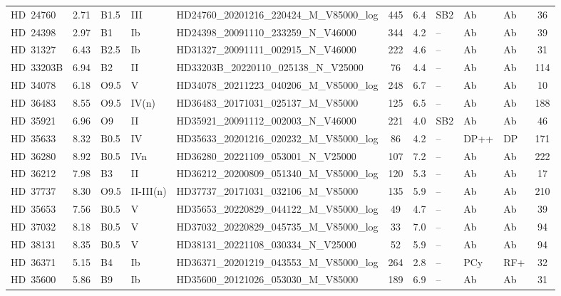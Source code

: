 {\begin{landscape}
\begin{longtable}{lclllcclllc}
\noalign{\smallskip}
HD~24760 & 2.71 & B1.5 & III & HD24760\_20201216\_220424\_M\_V85000\_log & 445 & 6.4 & SB2 & Ab & Ab & 36 \\
\noalign{\smallskip}
HD~24398 & 2.97 & B1 & Ib & HD24398\_20091110\_233259\_N\_V46000 & 344 & 4.2 & -- & Ab & Ab & 39 \\
\noalign{\smallskip}
HD~31327 & 6.43 & B2.5 & Ib & HD31327\_20091111\_002915\_N\_V46000 & 222 & 4.6 & -- & Ab & Ab & 31 \\
\noalign{\smallskip}
HD~33203B & 6.94 & B2 & II & HD33203B\_20220110\_025138\_N\_V25000 & 76 & 4.4 & -- & Ab & Ab & 114 \\
\noalign{\smallskip}
HD~34078 & 6.18 & O9.5 & V & HD34078\_20211223\_040206\_M\_V85000\_log & 248 & 6.7 & -- & Ab & Ab & 10 \\
\noalign{\smallskip}
HD~36483 & 8.55 & O9.5 & IV(n) & HD36483\_20171031\_025137\_M\_V85000 & 125 & 6.5 & -- & Ab & Ab & 188 \\
\noalign{\smallskip}
HD~35921 & 6.96 & O9 & II & HD35921\_20091112\_002003\_N\_V46000 & 221 & 4.0 & SB2 & Ab & Ab & 46 \\
\noalign{\smallskip}
HD~35633 & 8.32 & B0.5 & IV & HD35633\_20201216\_020232\_M\_V85000\_log & 86 & 4.2 & -- & DP++ & DP & 171 \\
\noalign{\smallskip}
HD~36280 & 8.92 & B0.5 & IVn & HD36280\_20221109\_053001\_N\_V25000 & 107 & 7.2 & -- & Ab & Ab & 222 \\
\noalign{\smallskip}
HD~36212 & 7.98 & B3 & II & HD36212\_20200809\_051340\_M\_V85000\_log & 120 & 5.3 & -- & Ab & Ab & 17 \\
\noalign{\smallskip}
HD~37737 & 8.30 & O9.5 & II-III(n) & HD37737\_20171031\_032106\_M\_V85000 & 135 & 5.9 & -- & Ab & Ab & 210 \\
\noalign{\smallskip}
HD~35653 & 7.56 & B0.5 & V & HD35653\_20220829\_044122\_M\_V85000\_log & 49 & 4.7 & -- & Ab & Ab & 39 \\
\noalign{\smallskip}
HD~37032 & 8.18 & B0.5 & V & HD37032\_20220829\_045735\_M\_V85000\_log & 33 & 7.0 & -- & Ab & Ab & 94 \\
\noalign{\smallskip}
HD~38131 & 8.35 & B0.5 & V & HD38131\_20221108\_030334\_N\_V25000 & 52 & 5.9 & -- & Ab & Ab & 94 \\
\noalign{\smallskip}
HD~36371 & 5.15 & B4 & Ib & HD36371\_20201219\_043553\_M\_V85000\_log & 264 & 2.8 & -- & PCy & RF+ & 32 \\
\noalign{\smallskip}
HD~35600 & 5.86 & B9 & Ib & HD35600\_20121026\_053030\_M\_V85000 & 189 & 6.9 & -- & Ab & Ab & 31 \\

\end{longtable}
\end{landscape}}
